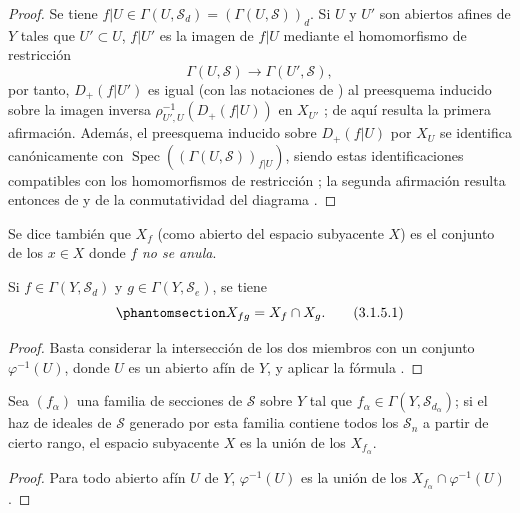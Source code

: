 \documentclass[oneside,10pt]{amsart}
\let\EGAOriginalLabel\label
\renewcommand{\label}[1]{\phantomsection\EGAOriginalLabel{#1}}
\begin{document}
\begin{proof}
Se tiene $f|U\in\Gamma(U,\mathcal{S}_d)=(\Gamma(U,\mathcal{S}))_d$.
Si $U$ y $U'$ son abiertos afines de $Y$ tales que $U'\subset U$, $f|U'$ es la imagen de $f|U$ mediante el homomorfismo de restricción
\[
  \Gamma(U,\mathcal{S})\longrightarrow\Gamma(U',\mathcal{S}),
\]
por tanto, $D_+(f|U')$ es igual (con las notaciones de ) al preesquema inducido sobre la imagen inversa $\rho_{U',U}^{-1}(D_+(f|U))$ en $X_{U'}$ ; de aquí resulta la primera afirmación.
Además, el preesquema inducido sobre $D_+(f|U)$ por $X_U$ se identifica canónicamente con $\operatorname{Spec}((\Gamma(U,\mathcal{S}))_{f|U})$, siendo estas identificaciones compatibles con los homomorfismos de restricción ; la segunda afirmación resulta entonces de  y de la conmutatividad del diagrama .
\end{proof}

Se dice también que $X_f$ (como abierto del espacio subyacente $X$) es el conjunto de los $x\in X$ donde $f$ \emph{no se anula}.

\begin{corollary}[3.1.5]
\label{II.3.1.5-fr}
Si $f\in\Gamma(Y,\mathcal{S}_d)$ y $g\in\Gamma(Y,\mathcal{S}_e)$, se tiene
\[
\label{II.3.1.5.1-fr}
  X_{fg}=X_f\cap X_g.
\tag{3.1.5.1}
\]
\end{corollary}

\begin{proof}
Basta considerar la intersección de los dos miembros con un conjunto $\varphi^{-1}(U)$, donde $U$ es un abierto afín de $Y$, y aplicar la fórmula .
\end{proof}

\begin{corollary}[3.1.6]
\label{II.3.1.6-fr}
Sea $(f_\alpha)$ una familia de secciones de $\mathcal{S}$ sobre $Y$ tal que $f_\alpha\in\Gamma(Y,\mathcal{S}_{d_\alpha})$; si el haz de ideales de $\mathcal{S}$ generado por esta familia  contiene todos los $\mathcal{S}_n$ a partir de cierto rango, el espacio subyacente $X$ es la unión de los $X_{f_\alpha}$.
\end{corollary}

\begin{proof}
Para todo abierto afín $U$ de $Y$, $\varphi^{-1}(U)$ es la unión de los $X_{f_\alpha}\cap\varphi^{-1}(U)$ .
\end{proof}
\end{document}
